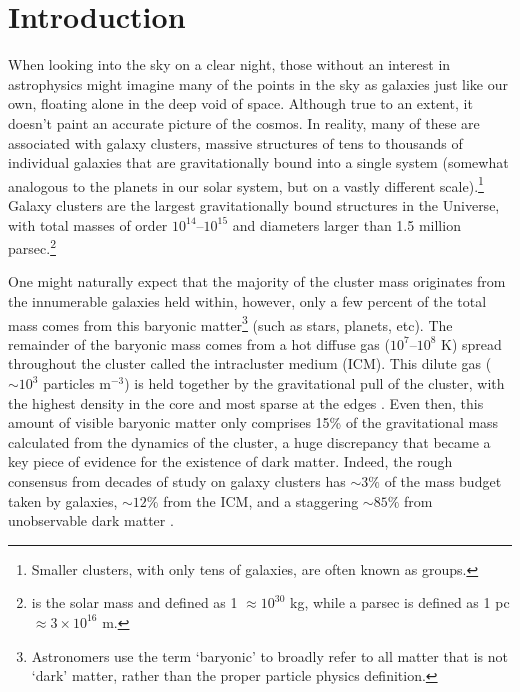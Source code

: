 \chapter[Introduction]{Introduction}
\label{Chap:Intro}


When looking into the sky on a clear night, those without an interest in astrophysics might imagine many of the points in the sky as galaxies just like our own, floating alone in the deep void of space. Although true to an extent, it doesn't paint an accurate picture of the cosmos. In reality, many of these are associated with galaxy clusters, massive structures of tens to thousands of individual galaxies that are gravitationally bound into a single system (somewhat analogous to the planets in our solar system, but on a vastly different scale).\footnote{Smaller clusters, with only tens of galaxies, are often known as groups.} Galaxy clusters are the largest gravitationally bound structures in the Universe, with total masses of order $10^{14}$--$10^{15}$ \Msun{} and diameters larger than 1.5 million parsec.\footnote{\Msun{} is the solar mass and defined as 1 \Msun{} $\approx 10^{30}$ kg, while a parsec is defined as 1 pc $\approx3\times10^{16}$ m. }

One might naturally expect that the majority of the cluster mass originates from the innumerable galaxies held within, however, only a few percent of the total mass comes from this baryonic matter\footnote{Astronomers use the term `baryonic' to broadly refer to all matter that is not `dark' matter, rather than the proper particle physics definition.} (such as stars, planets, etc). The remainder of the baryonic mass comes from a hot diffuse gas ($10^7$--$10^8$ K) spread throughout the cluster called the intracluster medium (ICM). This dilute gas ($\sim\!10^3$ particles m$^{-3}$) is held together by the gravitational pull of the cluster, with the highest density in the core and most sparse at the edges \citep{Meekins1971, Serlemitsos1977}. Even then, this amount of visible baryonic matter only comprises 15\% of the gravitational mass calculated from the dynamics of the cluster, a huge discrepancy that became a key piece of evidence for the existence of dark matter. Indeed, the rough consensus from decades of study on galaxy clusters has $\sim\!3\%$ of the mass budget taken by galaxies, $\sim\!12\%$ from the ICM, and a staggering $\sim\!85\%$ from unobservable dark matter \citep{Blumenthal1984,Vikhlinin2006,Pratt2019}. 

